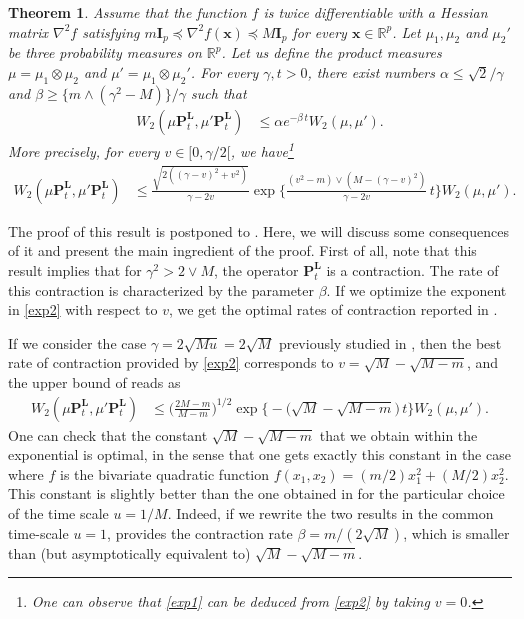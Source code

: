 \documentclass[a4paper,bej,preprint,reqno]{imsart}
\newcommand\bfP{\mathbf P}
\newcommand\bL{\boldsymbol L}
\newcommand\bx{\boldsymbol x}
\newcommand\RR{\mathbb R}
\newcommand\bfI{\mathbf I}
\newtheorem{theorem}{Theorem}
\begin{document}
\begin{theorem}\label{th:1}
Assume that the function $f$ is twice differentiable with a Hessian matrix
$\nabla^2f$ satisfying $m\bfI_p\preceq \nabla^2f(\bx)\preceq M\bfI_p$ for every
$\bx\in\RR^p$.
Let $\mu_1,\mu_2$ and $\mu_2'$ be three probability measures on $\RR^p$. Let
us define the product measures $\mu = \mu_1\otimes\mu_2$ and
$\mu' = \mu_1\otimes\mu_2'$. For every $\gamma,t>0$, there exist numbers
$\alpha\le \sqrt{2}/\gamma$ and $\beta\ge \{m\wedge (\gamma^2-M) \}/\gamma$
such that
\begin{align}\label{exp1}
W_2(\mu\bfP_t^{\bL},\mu'\bfP_t^{\bL})
	&\le \alpha
	e^{-\beta\,t}
	W_2(\mu,\mu').
\end{align}
More precisely, for every $v\in [0,\gamma/2[$, we have\footnote{One can observe that \eqref{exp1} can be deduced from
\eqref{exp2} by taking $v=0$.}
\begin{align}\label{exp2}
W_2(\mu\bfP_t^{\bL},\mu'\bfP_t^{\bL})
	&\le \frac{\sqrt{2((\gamma-v)^2+v^2)}}{\gamma-2v}
	\exp\bigg\{\frac{(v^2- m)\vee(M-(\gamma-v)^2)}{\gamma-2v}\,t\bigg\}
	W_2(\mu,\mu').
\end{align}
\end{theorem}

The proof of this result is postponed to . Here, we will discuss
some consequences of it and present the main ingredient of the proof. First of all, note that
this result implies that for $\gamma^2 > 2\vee M$, the operator $\bfP_t^{\bL}$ is a
contraction. The rate of this contraction is characterized by the parameter $\beta$.
If we optimize the exponent in \eqref{exp2} with respect to $v$, we get the optimal
rates of contraction reported in .

If we consider the case $\gamma = 2\sqrt{Mu}= 2\sqrt{M}$ previously studied in \citep{Cheng2},
then the best rate of contraction provided by \eqref{exp2} corresponds to $v = \sqrt{M}-\sqrt{M-m}$,
and the upper bound of  reads as
\begin{align}\label{contr:1}
W_2(\mu\bfP_t^{\bL},\mu'\bfP_t^{\bL})
	&\le \bigg(\frac{2M-m}{M-m}\bigg)^{1/2}\exp\big\{-\big(\sqrt{M}- \sqrt{M-m}\big)\,t\big\}W_2(\mu,\mu').
\end{align}
One can check that the constant $\sqrt{M}- \sqrt{M-m}$ that we
obtain within the exponential is optimal, in the sense that one gets exactly this
constant in the case where $f$ is the bivariate quadratic function
$f(x_1,x_2) = (m/2)x_1^2+(M/2)x_2^2$. This constant is slightly better than
the one obtained in \citep[Lemma 8]{Cheng2} for the particular choice of the time scale
$u=1/M$. Indeed, if we rewrite the two results in the common time-scale $u=1$,
\citep[Lemma 8]{Cheng2} provides the contraction rate $\beta =m/(2\sqrt{M} )$, which
is smaller than (but asymptotically equivalent to)
$\sqrt{M}- \sqrt{M-m}$.
\end{document}
